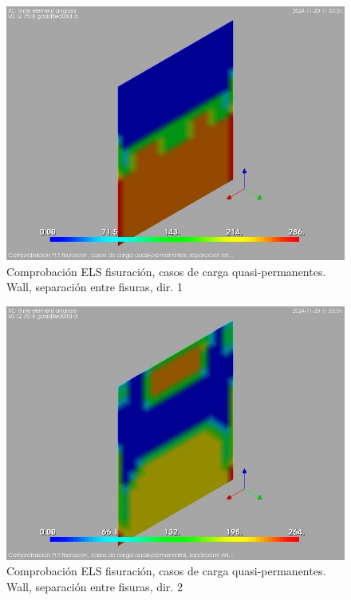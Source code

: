 \begin{figure}[ht]
\begin{center}
\includegraphics[width=\linewidth]{results/graphics/crackingSLS_qperm/walls_rmaxSect1}
\caption{Comprobación ELS fisuración, casos de carga quasi-permanentes. Wall, separación entre fisuras, dir. 1}
\label{SLS_quasiPermanentLoadsCrackControlwalls_rmaxSect1}
\end{center}
\end{figure}
\begin{figure}[ht]
\begin{center}
\includegraphics[width=\linewidth]{results/graphics/crackingSLS_qperm/walls_rmaxSect2}
\caption{Comprobación ELS fisuración, casos de carga quasi-permanentes. Wall, separación entre fisuras, dir. 2}
\label{SLS_quasiPermanentLoadsCrackControlwalls_rmaxSect2}
\end{center}
\end{figure}
